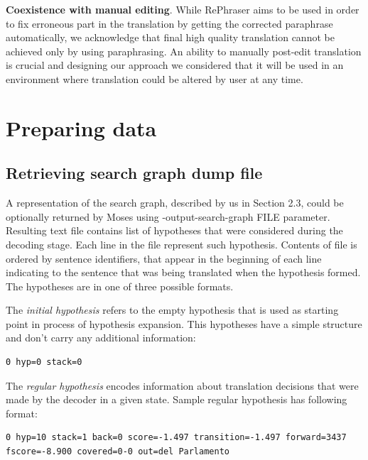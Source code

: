 \textbf{Coexistence with manual editing}. While RePhraser aims to be used in order to fix erroneous part in the translation by getting the corrected paraphrase automatically, we acknowledge that final high quality translation cannot be achieved only by using paraphrasing. An ability to manually post-edit translation is crucial and designing our approach we considered that it will be used in an environment where translation could be altered by user at any time.  

\section{Preparing data}

\subsection{Retrieving search graph dump file}

A representation of the search graph, described by us in Section 2.3, could be optionally returned by Moses using \textsf{-output-search-graph FILE} parameter. Resulting text file contains list of hypotheses that were considered during the decoding stage. Each line in the file represent such hypothesis. Contents of file is ordered by sentence identifiers, that appear in the beginning of each line indicating to the sentence that was being translated when the hypothesis formed. The hypotheses are in one of three possible formats.

The \textit{initial hypothesis} refers to the empty hypothesis that is used as starting point in process of hypothesis expansion. This hypotheses have a simple structure and don't carry any additional information:

\begin{verbatim}
0 hyp=0 stack=0
\end{verbatim}

The \textit{regular hypothesis} encodes information about translation decisions that were made by the decoder in a given state. Sample regular hypothesis has following format:

\begin{verbatim}
0 hyp=10 stack=1 back=0 score=-1.497 transition=-1.497 forward=3437
fscore=-8.900 covered=0-0 out=del Parlamento
\end{verbatim}

